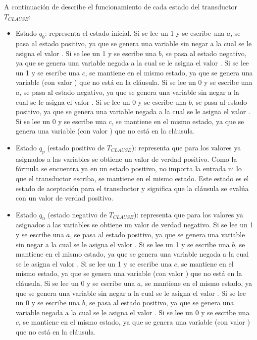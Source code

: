 A continuación de describe el funcionamiento de cada estado del transductor $T_{CLAUSE}$:
\begin{itemize}
    \item Estado $q_0$: representa el estado inicial.  Si se lee un 1 y se escribe una $a$, se pasa al estado positivo, ya que se genera una variable sin negar a la cual se le asigna el valor \true{}.  Si se lee un 1 y se escribe una $b$, se pasa al estado negativo, ya que se genera una variable negada a la cual se le asigna el valor \true{}.  Si se lee un 1 y se escribe una $c$, se mantiene en el mismo estado, ya que se genera una variable (con valor \true) que no está en la cláusula.  Si se lee un 0 y se escribe una $a$, se pasa al estado negativo, ya que se genera una variable sin negar a la cual se le asigna el valor \false{}.  Si se lee un 0 y se escribe una $b$, se pasa al estado positivo, ya que se genera una variable negada a la cual se le asigna el valor \false{}.  Si se lee un 0 y se escribe una $c$, se mantiene en el mismo estado, ya que se genera una variable (con valor \false) que no está en la cláusula.
          
    \item Estado $q_p$ (estado positivo de $T_{CLAUSE}$): representa que para los valores ya asignados a las variables se obtiene un valor de verdad positivo.  Como la fórmula se encuentra ya en un estado positivo, no importa la entrada ni lo que el transductor escriba, se mantiene en el mismo estado.  Este estado es el estado de aceptación para el transductor y significa que la cláusula se evalúa con un valor de verdad positivo.
          
    \item Estado $q_n$ (estado negativo de $T_{CLAUSE}$): representa que para los valores ya asignados a las variables se obtiene un valor de verdad negativo.  Si se lee un 1 y se escribe una $a$, se pasa al estado positivo, ya que se genera una variable sin negar a la cual se le asigna el valor \true{}.  Si se lee un 1 y se escribe una $b$, se mantiene en el mismo estado, ya que se genera una variable negada a la cual se le asigna el valor \true{}.  Si se lee un 1 y se escribe una $c$, se mantiene en el mismo estado, ya que se genera una variable (con valor \true) que no está en la cláusula. Si se lee un 0 y se escribe una $a$, se mantiene en el mismo estado, ya que se genera una variable sin negar a la cual se le asigna el valor \false{}.  Si se lee un 0 y se escribe una $b$, se pasa al estado positivo, ya que se genera una variable negada a la cual se le asigna el valor \false{}.  Si se lee un 0 y se escribe una $c$, se mantiene en el mismo estado, ya que se genera una variable (con valor \false) que no está en la cláusula.
\end{itemize}

